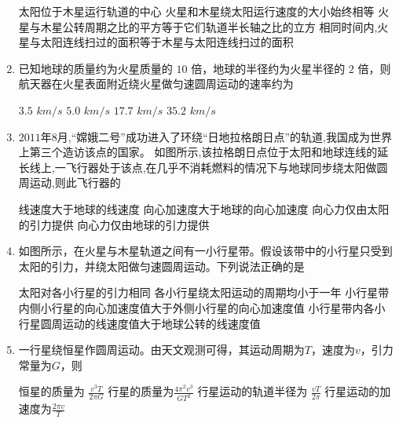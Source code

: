 \begin{enumerate}[leftmargin=0em]
\fourchoices
{太阳位于木星运行轨道的中心}
{火星和木星绕太阳运行速度的大小始终相等}
{火星与木星公转周期之比的平方等于它们轨道半长轴之比的立方}
{相同时间内,火星与太阳连线扫过的面积等于木星与太阳连线扫过的面积}

\item 
{}
已知地球的质量约为火星质量的 $ 10 $ 倍，地球的半径约为火星半径的 $ 2 $ 倍，则航天器在火星表面附近绕火星做匀速圆周运动的速率约为  

\fourchoices
{$ 3 . 5 $ $ km / s $}
{$ 5 . 0 $ $ km / s $}
{$ 17 . 7 $ $ km / s $}
{$ 35 . 2 $ $ km / s $}

\newpage
\item 
{}
$ 2011 $年$ 8 $月,“嫦娥二号”成功进入了环绕“日地拉格朗日点”的轨道,我国成为世界上第三个造访该点的国家。 如图所示,该拉格朗日点位于太阳和地球连线的延长线上,一飞行器处于该点,在几乎不消耗燃料的情况下与地球同步绕太阳做圆周运动,则此飞行器的  
\begin{figure}[h!]
\centering

\end{figure}


\fourchoices
{线速度大于地球的线速度}
{向心加速度大于地球的向心加速度}
{向心力仅由太阳的引力提供}
{向心力仅由地球的引力提供}





\item 
{}
如图所示，在火星与木星轨道之间有一小行星带。假设该带中的小行星只受到太阳的引力，并绕太阳做匀速圆周运动。下列说法正确的是  
\begin{figure}[h!]
\centering

\end{figure}

\fourchoices
{太阳对各小行星的引力相同}
{各小行星绕太阳运动的周期均小于一年}
{小行星带内侧小行星的向心加速度值大于外侧小行星的向心加速度值}
{小行星带内各小行星圆周运动的线速度值大于地球公转的线速度值}







\item 
{}
一行星绕恒星作圆周运动。由天文观测可得，其运动周期为$ T $，速度为$ v $，引力常量为$ G $，则  

\fourchoices
{恒星的质量为 $\frac { v ^ { 3 } T } { 2 \pi G }$ }
{行星的质量为$\frac { 4 \pi ^ { 2 } v ^ { 3 } } { G T ^ { 2 } }$}
{行星运动的轨道半径为 $\frac { v T } { 2 \pi }$ }
{行星运动的加速度为$\frac { 2 \pi v } { T }$}





\end{enumerate}
